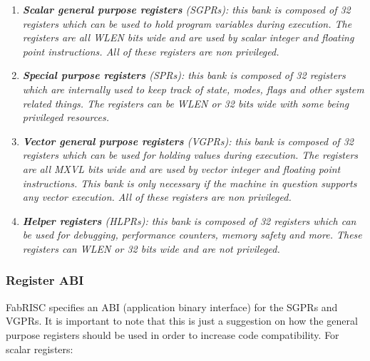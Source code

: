         \begin{enumerate}

            \item \textit{\textbf{Scalar general purpose registers} (SGPRs): this bank is composed of 32 registers which can be used to hold program variables during execution. The registers are all WLEN bits wide and are used by scalar integer and floating point instructions. All of these registers are non privileged.}

            \item \textit{\textbf{Special purpose registers} (SPRs): this bank is composed of 32 registers which are internally used to keep track of state, modes, flags and other system related things. The registers can be WLEN or 32 bits wide with some being privileged resources.}

            \item \textit{\textbf{Vector general purpose registers} (VGPRs): this bank is composed of 32 registers which can be used for holding values during execution. The registers are all MXVL bits wide and are used by vector integer and floating point instructions. This bank is only necessary if the machine in question supports any vector execution. All of these registers are non privileged.}

            \item \textit{\textbf{Helper registers} (HLPRs): this bank is composed of 32 registers which can be used for debugging, performance counters, memory safety and more. These registers can WLEN or 32 bits wide and are not privileged.}

        \end{enumerate}

        \vspace{10pt}
        
        \vspace{10pt}

        \subsubsection{Register ABI}

            \vspace{10pt}

            FabRISC specifies an ABI (application binary interface) for the SGPRs and VGPRs. It is important to note that this is just a suggestion on how the general purpose registers should be used in order to increase code compatibility. For scalar registers:

